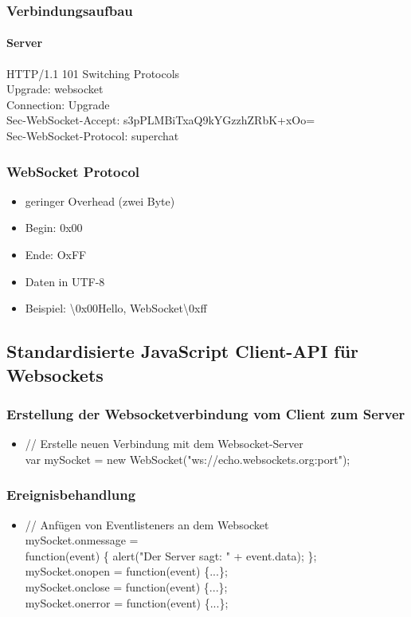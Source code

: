 \documentclass{beamer}
\begin{document}
\begin{frame}
\frametitle{Verbindungsaufbau}
\framesubtitle{Server}
HTTP/1.1 101 Switching Protocols\\
Upgrade: websocket\\
Connection: Upgrade\\
Sec-WebSocket-Accept: s3pPLMBiTxaQ9kYGzzhZRbK+xOo=\\
Sec-WebSocket-Protocol: superchat\\
\end{frame}

\begin{frame}
\frametitle{WebSocket Protocol}
\begin{itemize}
\item geringer Overhead (zwei Byte)
\item Begin: 0x00
\item Ende: OxFF
\item Daten in UTF-8
\item Beispiel: \textbackslash 0x00Hello, WebSocket\textbackslash 0xff
\end{itemize}
\end{frame}

\subsection{Standardisierte JavaScript Client-API für Websockets}
\begin{frame}
\frametitle{Erstellung der Websocketverbindung vom Client zum Server}
\begin{itemize}
\item // Erstelle neuen Verbindung mit dem Websocket-Server \\
var mySocket = new WebSocket("ws://echo.websockets.org:port");
\end{itemize}
\end{frame}

\begin{frame}
\frametitle{Ereignisbehandlung}
\begin{itemize}
\item // Anfügen von Eventlisteners an dem Websocket \\
	mySocket.onmessage = \\function(event) \{ alert("Der Server sagt: " + event.data); \}; \\
mySocket.onopen = function(event) \{...\}; \\
mySocket.onclose = function(event) \{...\}; \\
mySocket.onerror = function(event) \{...\}; \\
\end{itemize}
\end{frame}
\end{document}
